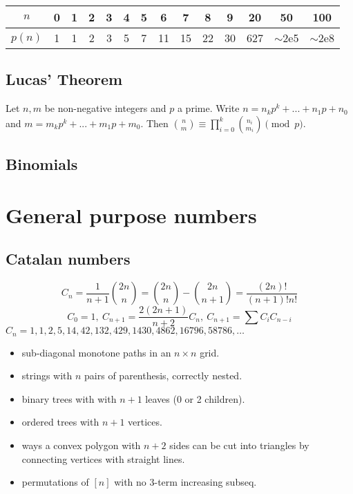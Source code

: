     \begin{center}
    \begin{tabular}{c|c@{\ }c@{\ }c@{\ }c@{\ }c@{\ }c@{\ }c@{\ }c@{\ }c@{\ }c@{\ }c@{\ }c@{\ }c}
      $n$    & 0 & 1 & 2 & 3 & 4 & 5 & 6  & 7  & 8  & 9  & 20  & 50  & 100 \\ \hline
      $p(n)$ & 1 & 1 & 2 & 3 & 5 & 7 & 11 & 15 & 22 & 30 & 627 & $\mathtt{\sim}$2e5 & $\mathtt{\sim}$2e8 \\
    \end{tabular}
    \end{center}

  \subsection{Lucas' Theorem}
    Let $n,m$ be non-negative integers and $p$ a prime. Write $n=n_kp^k+...+n_1p+n_0$ and $m=m_kp^k+...+m_1p+m_0$. Then $\binom{n}{m} \equiv \prod_{i=0}^k\binom{n_i}{m_i} \pmod{p}$.

  \subsection{Binomials}

\section{General purpose numbers}
  \subsection{Catalan numbers}
    \[ C_n=\frac{1}{n+1}\binom{2n}{n}= \binom{2n}{n}-\binom{2n}{n+1} = \frac{(2n)!}{(n+1)!n!} \]
    \[ C_0=1,\ C_{n+1} = \frac{2(2n+1)}{n+2}C_n,\ C_{n+1}=\sum C_iC_{n-i} \]
    ${C_n = 1, 1, 2, 5, 14, 42, 132, 429, 1430, 4862, 16796, 58786, \dots}$
    \begin{itemize}[noitemsep]
      \item sub-diagonal monotone paths in an $n\times n$ grid.
      \item strings with $n$ pairs of parenthesis, correctly nested.
      \item binary trees with with $n+1$ leaves (0 or 2 children).
      \item ordered trees with $n+1$ vertices.
      \item ways a convex polygon with $n+2$ sides can be cut into triangles by connecting vertices with straight lines.
      \item permutations of $[n]$ with no 3-term increasing subseq.
    \end{itemize}


